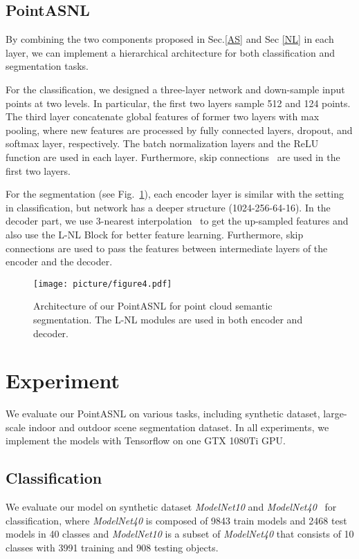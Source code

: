 \documentclass[10pt,twocolumn,letterpaper]{article}
\begin{document}
	
	\subsection{PointASNL}
	\label{PNL}
	By combining the two components proposed in Sec.\ref{AS} and Sec \ref{NL} in each layer, we can implement a hierarchical architecture for both classification and segmentation tasks. 
	
	For the {classification}, we designed a three-layer network and down-sample input points at two levels. In particular,  the first two layers sample 512 and 124 points. The third layer concatenate global features of former two layers with max pooling, where new features are processed by fully connected layers, dropout, and softmax layer, respectively. The batch normalization layers and the ReLU function are used in each layer. Furthermore, skip connections~\cite{resnet} are used in the first two layers.
	
	For the {segmentation} (see Fig.~\ref{fig:figure4}), each encoder layer is similar with the setting in classification, but network has a deeper structure (1024-256-64-16). In the decoder part, we use 3-nearest interpolation~\cite{pointnet2} to get the up-sampled features and also use the L-NL Block for better feature learning. Furthermore, skip connections are used to pass the features between intermediate layers of the encoder and the decoder.
	
	
	\begin{figure}[t]
		\begin{center}
			\texttt{[image: picture/figure4.pdf]}
		\end{center}
		\caption{{Architecture of our PointASNL for point cloud semantic segmentation.} The L-NL modules are used in both encoder and decoder.}
		\label{fig:figure4}
		\vspace{-0.3cm}
	\end{figure}
	
	


	\section{Experiment}
	\label{exp}
	
	We evaluate our PointASNL on various tasks, including synthetic dataset, large-scale indoor and outdoor scene segmentation dataset. In all experiments, we implement the models with Tensorflow on one GTX 1080Ti GPU. 
	
\subsection{Classification}
	We evaluate our model on synthetic dataset \textit{ModelNet10} and \textit{ModelNet40}~\cite{modelnet} for classification, where \textit {ModelNet40} is composed of 9843 train models and 2468 test models in 40 classes and  \textit {ModelNet10} is a subset of \textit{ModelNet40} that consists of 10 classes with 3991 training and 908 testing objects. 
\end{document}
